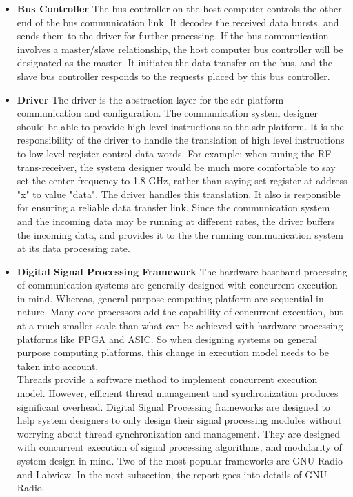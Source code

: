 \begin{itemize}
\item{\textbf{Bus Controller} The bus controller on the host computer controls the other end of the bus communication link.
It decodes the received data bursts, and sends them to the driver for further processing.
If the bus communication involves a master/slave relationship, the host computer bus controller will be designated as the master.
It initiates the data transfer on the bus, and the slave bus controller  responds to the requests placed by this bus controller.
}
\item{\textbf{Driver} The driver is the abstraction layer for the \ac{sdr} platform communication and configuration.
The communication system designer should be able to provide high level instructions to the \ac{sdr} platform.
It is the responsibility of the driver to handle the translation of high level instructions to low level register control data words.
For example: when tuning the RF trans-receiver, the system designer would be much more comfortable to say set the center frequency to 1.8 GHz, rather than saying set register at address "x" to value "data".
The driver handles this translation.
It also is responsible for ensuring a reliable data transfer link.
Since the communication system and the incoming data may be running at different rates, the driver buffers the incoming data, and provides it to the the running communication system at its data processing rate.}

\item{\textbf{Digital Signal Processing Framework} The hardware baseband processing of communication systems are generally designed with concurrent execution in mind.
Whereas, general purpose computing platform are sequential in nature. Many core processors add the capability of concurrent execution, but at a much smaller scale than what can be achieved with hardware processing platforms like \ac{FPGA} and \ac{ASIC}.
So when designing systems on general purpose computing platforms, this change in execution model needs to be taken into account.\\

Threads provide a software method to implement concurrent execution model. 
However, efficient thread management and synchronization produces significant overhead.
Digital Signal Processing frameworks are designed to help system designers to only design their signal processing modules without worrying about thread synchronization and management.
They are designed with concurrent execution of signal processing algorithms, and modularity of system design in mind.
Two of the most popular frameworks are GNU Radio and Labview.
In the next subsection, the report goes into details of GNU Radio. 
}
\end{itemize}
